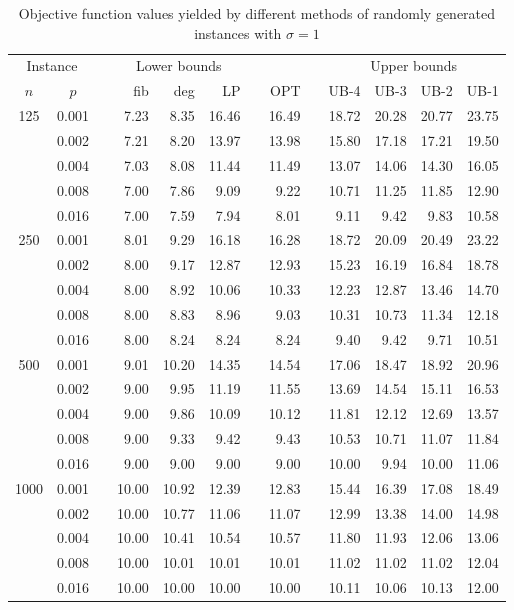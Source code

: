 \begin{footnotesize}
\begin{table}[]
\centering
\begin{tabular}{ccrrrrrrrrrrr}
\multicolumn{2}{c}{Instance} & &\multicolumn{3}{c}{Lower bounds} & & & &\multicolumn{4}{c}{Upper bounds} \\
\cline{1-2}\cline{4-6}\cline{10-13}
$n$ & $p$  &   & fib  & deg  & LP  &  & OPT & & UB-4  & UB-3  & UB-2  & UB-1  \\
\hline
\multirow{5}{*}{125} 
& 0.001 && 7.23 & 8.35 & 16.46 && 16.49 && 18.72 & 20.28 & 20.77 & 23.75 \\
& 0.002 && 7.21 & 8.20 & 13.97 && 13.98 && 15.80 & 17.18 & 17.21 & 19.50 \\
& 0.004 && 7.03 & 8.08 & 11.44 && 11.49 && 13.07 & 14.06 & 14.30 & 16.05 \\
& 0.008 && 7.00 & 7.86 & 9.09  && 9.22  && 10.71 & 11.25 & 11.85 & 12.90 \\
& 0.016 && 7.00 & 7.59 & 7.94  && 8.01  && 9.11  & 9.42  & 9.83  & 10.58 \\
\hline
\multirow{5}{*}{250} 
& 0.001 && 8.01 & 9.29 & 16.18 && 16.28 && 18.72 & 20.09 & 20.49 & 23.22 \\
& 0.002 && 8.00 & 9.17 & 12.87 && 12.93 && 15.23 & 16.19 & 16.84 & 18.78 \\
& 0.004 && 8.00 & 8.92 & 10.06 && 10.33 && 12.23 & 12.87 & 13.46 & 14.70 \\
& 0.008 && 8.00 & 8.83 & 8.96  && 9.03  && 10.31 & 10.73 & 11.34 & 12.18 \\
& 0.016 && 8.00 & 8.24 & 8.24  && 8.24  && 9.40  & 9.42  & 9.71  & 10.51 \\
\hline
\multirow{5}{*}{500} 
& 0.001 && 9.01 & 10.20 & 14.35 && 14.54 && 17.06 & 18.47 & 18.92 & 20.96 \\
& 0.002 && 9.00 & 9.95  & 11.19 && 11.55 && 13.69 & 14.54 & 15.11 & 16.53 \\
& 0.004 && 9.00 & 9.86  & 10.09 && 10.12 && 11.81 & 12.12 & 12.69 & 13.57 \\
& 0.008 && 9.00 & 9.33  & 9.42  && 9.43  && 10.53 & 10.71 & 11.07 & 11.84 \\
& 0.016 && 9.00 & 9.00  & 9.00  && 9.00  && 10.00 & 9.94  & 10.00 & 11.06 \\
\hline
\multirow{5}{*}{1000} 
& 0.001 && 10.00 & 10.92 & 12.39 && 12.83 && 15.44 & 16.39 & 17.08 & 18.49 \\
& 0.002 && 10.00 & 10.77 & 11.06 && 11.07 && 12.99 & 13.38 & 14.00 & 14.98 \\
& 0.004 && 10.00 & 10.41 & 10.54 && 10.57 && 11.80 & 11.93 & 12.06 & 13.06 \\
& 0.008 && 10.00 & 10.01 & 10.01 && 10.01 && 11.02 & 11.02 & 11.02 & 12.04 \\
& 0.016 && 10.00 & 10.00 & 10.00 && 10.00 && 10.11 & 10.06 & 10.13 & 12.00 \\
\end{tabular}                              
\caption{Objective function values yielded by different methods of randomly generated instances with $\sigma=1$}
\label{tab:obj-s1}
\end{table}


\end{footnotesize}

